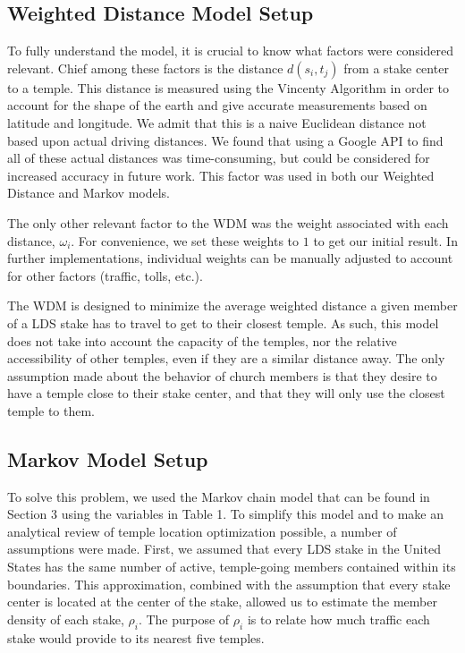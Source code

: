 \documentclass[twoside,twocolumn]{article}
\begin{document}
\subsection{Weighted Distance Model Setup}

To fully understand the model, it is crucial to know what factors were considered relevant.
Chief among these factors is the distance $d(s_i,t_j)$ from a stake center to a temple.
This distance is measured using the Vincenty Algorithm in order to account for the shape of the earth and give accurate measurements based on latitude and longitude.
We admit that this is a naive Euclidean distance not based upon actual driving distances.
We found that using a Google API to find all of these actual distances was time-consuming, but could be considered for increased accuracy in future work.
This factor was used in both our Weighted Distance and Markov models.

The only other relevant factor to the WDM was the weight associated with each distance, $\omega_i$.
For convenience, we set these weights to $1$ to get our initial result.
In further implementations, individual weights can be manually adjusted to account for other factors (traffic, tolls, etc.).

The WDM is designed to minimize the average weighted distance a given member of a LDS stake has to travel to get to their closest temple.
As such, this model does not take into account the capacity of the temples, nor the relative accessibility of other temples, even if they are a similar distance away.
The only assumption made about the behavior of church members is that they desire to have a temple close to their stake center, and that they will only use the closest temple to them.

\subsection{Markov Model Setup}

To solve this problem, we used the Markov chain model that can be found in Section 3 using the variables in Table 1.
To simplify this model and to make an analytical review of temple location optimization possible, a number of assumptions were made.
First, we assumed that every LDS stake in the United States has the same number of active, temple-going members contained within its boundaries.
This approximation, combined with the assumption that every stake center is located at the center of the stake, allowed us to estimate the member density of each stake, $\rho_i$.
The purpose of $\rho_{i}$ is to relate how much traffic each stake would provide to its nearest five temples.
\end{document}
